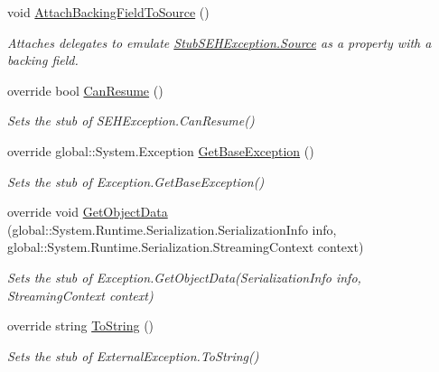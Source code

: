\begin{DoxyCompactItemize}
void \hyperlink{class_system_1_1_runtime_1_1_interop_services_1_1_fakes_1_1_stub_s_e_h_exception_a85eec9f94c0b55a32daffd72f37764c1}{Attach\-Backing\-Field\-To\-Source} ()
\begin{DoxyCompactList}\small\item\em Attaches delegates to emulate \hyperlink{class_system_1_1_runtime_1_1_interop_services_1_1_fakes_1_1_stub_s_e_h_exception_a2c3853b4ba88fae60431d3105ff1f469}{Stub\-S\-E\-H\-Exception.\-Source} as a property with a backing field.\end{DoxyCompactList}\item 
override bool \hyperlink{class_system_1_1_runtime_1_1_interop_services_1_1_fakes_1_1_stub_s_e_h_exception_ae7d77d95e771bb7fb1d7ef5fcdfeb0c6}{Can\-Resume} ()
\begin{DoxyCompactList}\small\item\em Sets the stub of S\-E\-H\-Exception.\-Can\-Resume()\end{DoxyCompactList}\item 
override global\-::\-System.\-Exception \hyperlink{class_system_1_1_runtime_1_1_interop_services_1_1_fakes_1_1_stub_s_e_h_exception_a1c5d6d1dcc29080cb4e14ab51bf810ba}{Get\-Base\-Exception} ()
\begin{DoxyCompactList}\small\item\em Sets the stub of Exception.\-Get\-Base\-Exception()\end{DoxyCompactList}\item 
override void \hyperlink{class_system_1_1_runtime_1_1_interop_services_1_1_fakes_1_1_stub_s_e_h_exception_a4f891de5857db0515d46f741e9a0aa17}{Get\-Object\-Data} (global\-::\-System.\-Runtime.\-Serialization.\-Serialization\-Info info, global\-::\-System.\-Runtime.\-Serialization.\-Streaming\-Context context)
\begin{DoxyCompactList}\small\item\em Sets the stub of Exception.\-Get\-Object\-Data(\-Serialization\-Info info, Streaming\-Context context)\end{DoxyCompactList}\item 
override string \hyperlink{class_system_1_1_runtime_1_1_interop_services_1_1_fakes_1_1_stub_s_e_h_exception_a3c8241fb85527d9e76e98b7265a69db1}{To\-String} ()
\begin{DoxyCompactList}\small\item\em Sets the stub of External\-Exception.\-To\-String()\end{DoxyCompactList}\end{DoxyCompactItemize}
